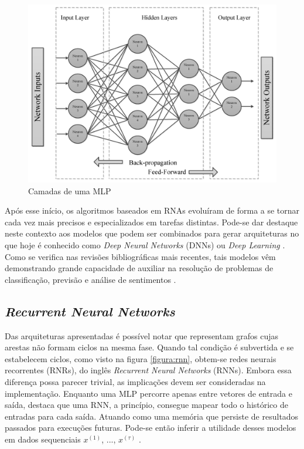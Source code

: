 \begin{figure}[!htb] \centering
  \caption{Camadas de uma MLP} \label{figura:multilayer}
  \begin{varwidth}{\linewidth}
    \includegraphics[width=12cm]{figuras/mlp.png}
  \end{varwidth}
\end{figure}

Após esse início, os algoritmos baseados em RNAs evoluíram de forma a se tornar cada vez mais precisos e especializados em tarefas distintas.
Pode-se dar destaque neste contexto aos modelos
que podem ser combinados para gerar arquiteturas no que hoje é conhecido como \textit{Deep Neural Networks} (DNNs) ou \textit{Deep Learning} \cite{Good}. 
Como se verifica nas revisões bibliográficas mais recentes, tais modelos vêm demonstrando grande capacidade de auxiliar na resolução de problemas de classificação, previsão e análise de sentimentos \cite{Hanc}.

\subsection{\textit{Recurrent Neural Networks}} \label{sec:rnn}

Das arquiteturas apresentadas é possível notar que representam grafos cujas arestas não formam ciclos na mesma fase.
Quando tal condição é subvertida e se estabelecem ciclos, como visto na figura \ref{figura:rnn}, obtem-se redes neurais recorrentes (RNRs), do inglês \textit{Recurrent Neural Networks} (RNNs)\cite{graves}.
Embora essa diferença possa parecer trivial, as implicações devem ser consideradas na implementação.
Enquanto uma MLP percorre apenas entre vetores de entrada e saída, \textcite{graves} destaca que uma RNN, a princípio, consegue mapear todo o histórico de entradas para cada saída. Atuando como uma memória que persiste de resultados passados para execuções futuras. 
Pode-se então inferir a utilidade desses modelos em dados sequenciais $x^{(1)}$, ..., $x^{(\tau)}$ \cite{Good}.

